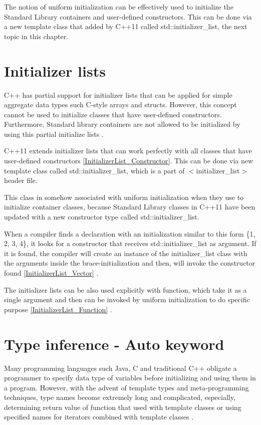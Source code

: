 \documentclass[11pt]{report}
\begin{document}
The notion of uniform initialization can be effectively used to initialize the Standard Library containers and user-defined constructors. This can be done via a new template class that added by C++11 called std::initializer\_list, the next topic in this chapter.


\section{Initializer lists}
\label{section: Initializer lists}
C++ has partial support for initializer lists that can be applied for simple aggregate data types such C-style arrays and structs. However, this concept cannot be used to initialize classes that have user-defined constructors. Furthermore, Standard library containers are not allowed to be initialized by using this partial initialize lists \cite{Reddy:2011:API}.


C++11 extends initializer lists that can work perfectly with all classes that have user-defined constructors \ref{InitializerList_Constructor}. This can be done via new template class called std::initializer\_list, which is a part of $<$initializer\_list$>$ header file.


This class in somehow associated with uniform initialization when they use to initialize container classes, because Standard Library classes in C++11 have been updated with a new constructor type called std::initializer\_list.


When a compiler finds a declaration with an initialization similar to this form \{1, 2, 3, 4\}, it looks for a constructor that receives std::initializer\_list as argument. If it is found, the compiler will create an instance of the initializer\_list class with the arguments inside the brace-initialization and then, will invoke the constructor found \ref{InitializerList_Vector} \cite{Reddy:2011:API}. 


The initializer lists can be also used explicitly with function, which take it as a single argument and then can be invoked by uniform initialization to do specific purpose \ref{InitializerList_Function} \cite{Reddy:2011:API}.


\section{Type inference - Auto keyword}
\label{section: Auto keyword}
Many programming languages such Java, C and traditional C++ obligate a programmer to specify data type of variables before initializing and using them in a program. However, with the advent of template types and meta-programming techniques, type names become extremely long and complicated, especially, determining return value of function that used with template classes or using specified names for iterators combined with template classes \cite{Horstmann:2008:BC}.
\end{document}
